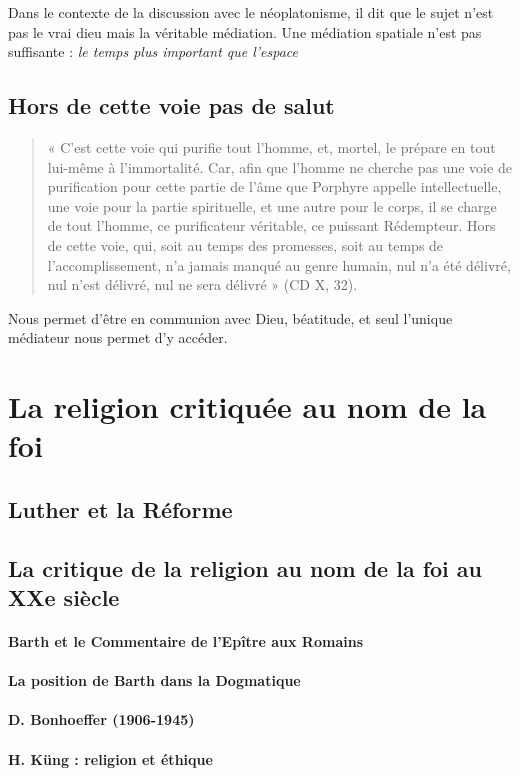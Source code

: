 Dans le contexte de la discussion avec le néoplatonisme, il dit que le sujet n'est pas le vrai dieu mais la véritable médiation. Une médiation spatiale n'est pas suffisante : \textit{le temps plus important que l'espace}


\subsection{Hors de cette voie pas de salut }
 
 

\begin{quote}
« C’est cette voie qui purifie tout l’homme, et, mortel, le prépare en tout lui-même à l’immortalité.
Car, afin que l’homme ne cherche pas une voie de purification pour cette partie de l’âme que Porphyre
appelle intellectuelle, une voie pour la partie spirituelle, et une autre pour le corps, il se charge de tout
l’homme, ce purificateur véritable, ce puissant Rédempteur. Hors de cette voie, qui, soit au temps des
promesses, soit au temps de l’accomplissement, n’a jamais manqué au genre humain, nul n’a été
délivré, nul n’est délivré, nul ne sera délivré » (CD X, 32).
\end{quote}

Nous permet d'être en communion avec Dieu, béatitude, et seul l'unique médiateur nous permet d'y accéder.

 


 
 \section{La religion critiquée au nom de la foi}
\subsection{Luther et la Réforme}

\subsection{La critique de la religion au nom de la foi au XXe siècle}

\paragraph{Barth et le Commentaire de l’Epître aux Romains}

\paragraph{La position de Barth dans la Dogmatique}

\paragraph{D. Bonhoeffer (1906-1945)}

\paragraph{H. Küng : religion et éthique}

\subsectionConclusion{}
 